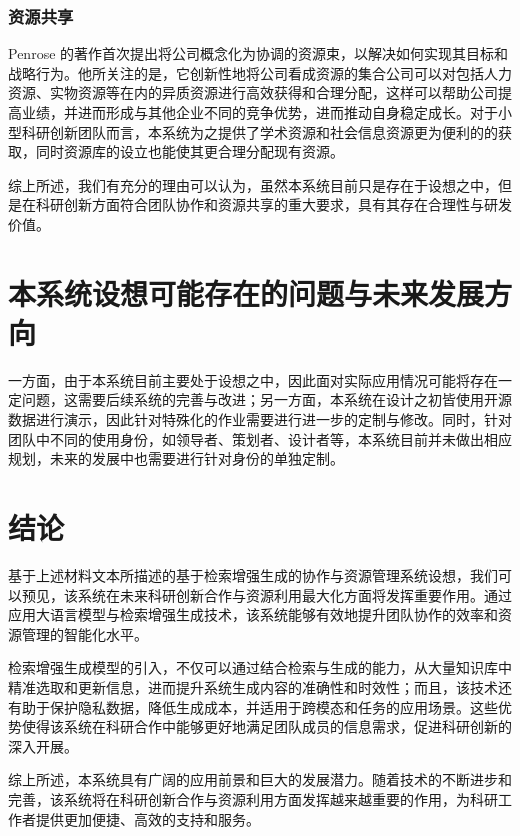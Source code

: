 \documentclass[zihao=-4]{ctexart}
\begin{document}
\begin{spacing}{1.5}
\subsubsection{资源共享}
Penrose 的著作首次提出将公司概念化为协调的资源束，以解决如何实现其目标和战略行为。他所关注的是，它创新性地将公司看成资源的集合公司可以对包括人力资源、实物资源等在内的异质资源进行高效获得和合理分配，这样可以帮助公司提高业绩，并进而形成与其他企业不同的竞争优势，进而推动自身稳定成长\cite{9}。对于小型科研创新团队而言，本系统为之提供了学术资源和社会信息资源更为便利的的获取，同时资源库的设立也能使其更合理分配现有资源。

综上所述，我们有充分的理由可以认为，虽然本系统目前只是存在于设想之中，但是在科研创新方面符合团队协作和资源共享的重大要求，具有其存在合理性与研发价值。
\section{本系统设想可能存在的问题与未来发展方向}
  一方面，由于本系统目前主要处于设想之中，因此面对实际应用情况可能将存在一定问题，这需要后续系统的完善与改进；另一方面，本系统在设计之初皆使用开源数据进行演示，因此针对特殊化的作业需要进行进一步的定制与修改。同时，针对团队中不同的使用身份，如领导者、策划者、设计者等，本系统目前并未做出相应规划，未来的发展中也需要进行针对身份的单独定制。
\section*{结论}%
基于上述材料文本所描述的基于检索增强生成的协作与资源管理系统设想，我们可以预见，该系统在未来科研创新合作与资源利用最大化方面将发挥重要作用。通过应用大语言模型与检索增强生成技术，该系统能够有效地提升团队协作的效率和资源管理的智能化水平。

检索增强生成模型的引入，不仅可以通过结合检索与生成的能力，从大量知识库中精准选取和更新信息，进而提升系统生成内容的准确性和时效性；而且，该技术还有助于保护隐私数据，降低生成成本，并适用于跨模态和任务的应用场景。这些优势使得该系统在科研合作中能够更好地满足团队成员的信息需求，促进科研创新的深入开展。

综上所述，本系统具有广阔的应用前景和巨大的发展潜力。随着技术的不断进步和完善，该系统将在科研创新合作与资源利用方面发挥越来越重要的作用，为科研工作者提供更加便捷、高效的支持和服务。
\end{spacing}

\newpage
\end{document}
